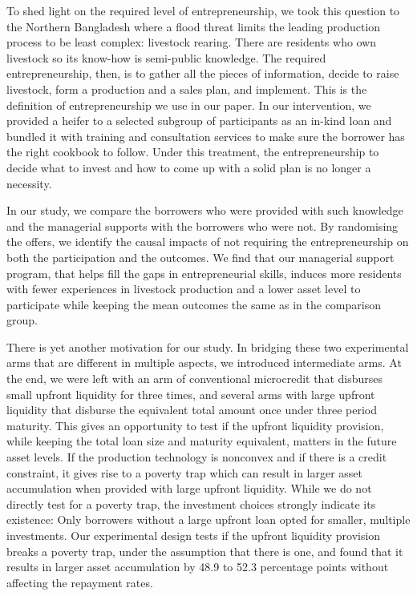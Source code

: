 	To shed light on the required level of entrepreneurship, we took this question to the Northern Bangladesh where a flood threat limits the leading production process to be least complex: livestock rearing. There are residents who own livestock so its know-how is semi-public knowledge. The required entrepreneurship, then, is to gather all the pieces of information, decide to raise livestock, form a production and a sales plan, and implement. This is the definition of entrepreneurship we use in our paper. In our intervention, we provided a heifer to a selected subgroup of participants as an in-kind loan and bundled it with training and consultation services to make sure the borrower has the right cookbook to follow. Under this treatment, the entrepreneurship to decide what to invest and how to come up with a solid plan is no longer a necessity.

	In our study, we compare the borrowers who were provided with such knowledge and the managerial supports with the borrowers who were not. By randomising the offers, we identify the causal impacts of not requiring the entrepreneurship on both the participation and the outcomes. We find that our managerial support program, that helps fill the gaps in entrepreneurial skills, induces more residents with fewer experiences in livestock production and a lower asset level to participate while keeping the mean outcomes the same as in the comparison group.%

	There is yet another motivation for our study. In bridging these two experimental arms that are different in multiple aspects, we introduced intermediate arms. At the end, we were left with an arm of conventional microcredit that disburses small upfront liquidity for three times, and several arms with large upfront liquidity that disburse the equivalent total amount once under three period maturity. This gives an opportunity to test if the upfront liquidity provision, while keeping the total loan size and maturity equivalent, matters in the future asset levels. If the production technology is nonconvex and if there is a credit constraint, it gives rise to a poverty trap which can result in larger asset accumulation when provided with large upfront liquidity. While we do not directly test for a poverty trap, the investment choices strongly indicate its existence: Only borrowers without a large upfront loan opted for smaller, multiple investments. Our experimental design tests if the upfront liquidity provision breaks a poverty trap, under the assumption that there is one, and found that it results in larger asset accumulation by 48.9 to 52.3 percentage points without affecting the repayment rates.

